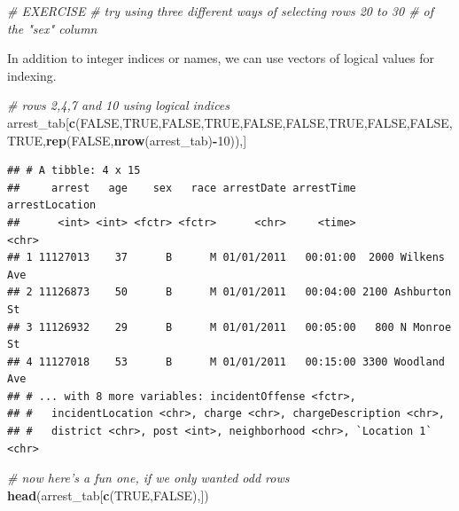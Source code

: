 \documentclass[]{book}
\newenvironment{Shaded}{\begin{snugshade}}{\end{snugshade}}
\newcommand{\KeywordTok}[1]{\textcolor[rgb]{0.13,0.29,0.53}{\textbf{#1}}}
\newcommand{\DecValTok}[1]{\textcolor[rgb]{0.00,0.00,0.81}{#1}}
\newcommand{\CommentTok}[1]{\textcolor[rgb]{0.56,0.35,0.01}{\textit{#1}}}
\newcommand{\OtherTok}[1]{\textcolor[rgb]{0.56,0.35,0.01}{#1}}
\newcommand{\OperatorTok}[1]{\textcolor[rgb]{0.81,0.36,0.00}{\textbf{#1}}}
\newcommand{\NormalTok}[1]{#1}
\theoremstyle{definition}
\theoremstyle{definition}
\theoremstyle{remark}
\begin{document}
\begin{Shaded}
\begin{Highlighting}[]
\CommentTok{# EXERCISE}
\CommentTok{# try using three different ways of selecting rows 20 to 30 # of the "sex" column}
\end{Highlighting}
\end{Shaded}

In addition to integer indices or names, we can use vectors of logical
values for indexing.

\begin{Shaded}
\begin{Highlighting}[]
\CommentTok{# rows 2,4,7 and 10 using logical indices}
\NormalTok{arrest_tab[}\KeywordTok{c}\NormalTok{(}\OtherTok{FALSE}\NormalTok{,}\OtherTok{TRUE}\NormalTok{,}\OtherTok{FALSE}\NormalTok{,}\OtherTok{TRUE}\NormalTok{,}\OtherTok{FALSE}\NormalTok{,}\OtherTok{FALSE}\NormalTok{,}\OtherTok{TRUE}\NormalTok{,}\OtherTok{FALSE}\NormalTok{,}\OtherTok{FALSE}\NormalTok{,}\OtherTok{TRUE}\NormalTok{,}\KeywordTok{rep}\NormalTok{(}\OtherTok{FALSE}\NormalTok{,}\KeywordTok{nrow}\NormalTok{(arrest_tab)}\OperatorTok{-}\DecValTok{10}\NormalTok{)),]}
\end{Highlighting}
\end{Shaded}

\begin{verbatim}
## # A tibble: 4 x 15
##     arrest   age    sex   race arrestDate arrestTime    arrestLocation
##      <int> <int> <fctr> <fctr>      <chr>     <time>             <chr>
## 1 11127013    37      B      M 01/01/2011   00:01:00  2000 Wilkens Ave
## 2 11126873    50      B      M 01/01/2011   00:04:00 2100 Ashburton St
## 3 11126932    29      B      M 01/01/2011   00:05:00   800 N Monroe St
## 4 11127018    53      B      M 01/01/2011   00:15:00 3300 Woodland Ave
## # ... with 8 more variables: incidentOffense <fctr>,
## #   incidentLocation <chr>, charge <chr>, chargeDescription <chr>,
## #   district <chr>, post <int>, neighborhood <chr>, `Location 1` <chr>
\end{verbatim}

\begin{Shaded}
\begin{Highlighting}[]
\CommentTok{# now here's a fun one, if we only wanted odd rows}
\KeywordTok{head}\NormalTok{(arrest_tab[}\KeywordTok{c}\NormalTok{(}\OtherTok{TRUE}\NormalTok{,}\OtherTok{FALSE}\NormalTok{),])}
\end{Highlighting}
\end{Shaded}
\end{document}
